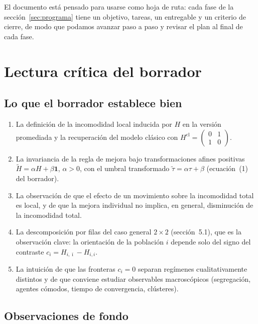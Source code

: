 \documentclass[11pt,a4paper]{article}
\theoremstyle{plain}
\theoremstyle{definition}
\theoremstyle{remark}
\newcommand{\one}{\mathbf{1}}
\newcommand{\Hcl}{H^{\mathrm{cl}}}
\begin{document}
El documento está pensado para usarse como hoja de ruta: cada fase de la
sección~\ref{sec:programa} tiene un objetivo, tareas, un entregable y un
criterio de cierre, de modo que podamos avanzar paso a paso y revisar el plan al
final de cada fase.

\section{Lectura crítica del borrador}
\label{sec:critica}

\subsection{Lo que el borrador establece bien}

\begin{enumerate}[label=(\alph*)]
  \item La definición de la incomodidad local inducida por $H$ en la versión
  promediada y la recuperación del modelo clásico con
  $\Hcl=\left(\begin{smallmatrix}0&1\\1&0\end{smallmatrix}\right)$.
  \item La invariancia de la regla de mejora bajo transformaciones afines
  positivas $\widetilde H=\alpha H+\beta\one$, $\alpha>0$, con el umbral
  transformado $\widetilde\tau=\alpha\tau+\beta$ (ecuación~(1) del borrador).
  \item La observación de que el efecto de un movimiento sobre la incomodidad
  total es local, y de que la mejora individual no implica, en general,
  disminución de la incomodidad total.
  \item La descomposición por filas del caso general $2\times2$
  (sección~5.1), que es la observación clave: la orientación de la población
  $i$ depende solo del signo del contraste $c_i=H_{i,\bar\imath}-H_{i,i}$.
  \item La intuición de que las fronteras $c_i=0$ separan regímenes
  cualitativamente distintos y de que conviene estudiar observables
  macroscópicos (segregación, agentes cómodos, tiempo de convergencia,
  clústeres).
\end{enumerate}

\subsection{Observaciones de fondo}
\end{document}
